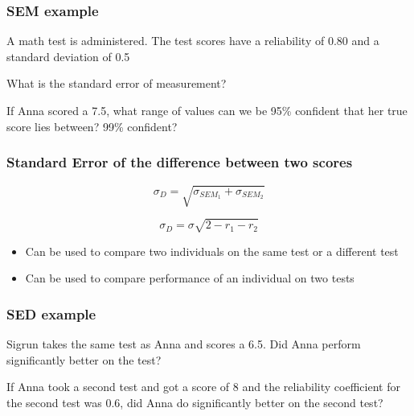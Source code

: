 \documentclass[dvipsnames]{beamer}\usepackage[]{graphicx}\usepackage[]{color}
\begin{document}
\begin{frame}
\frametitle{SEM example}

A math test is administered. The test scores have a reliability of 0.80 and a standard deviation of 0.5

\vspace{1cm}
What is the standard error of measurement?

\vspace{1cm}
If Anna scored a 7.5, what range of values can we be 95\% confident that her true score lies between? 99\% confident?
\end{frame}

\begin{frame}
\frametitle{Standard Error of the difference between two scores}
$$\sigma_D = \sqrt{\sigma_{SEM_1} + \sigma_{SEM_2}} $$

$$\sigma_D = \sigma\sqrt{2 - r_1 - r_2} $$

\begin{itemize}
  \item Can be used to compare two individuals on the same test or a different test
  \item Can be used to compare performance of an individual on two tests
\end{itemize}
\end{frame}

\begin{frame}
\frametitle{SED example}
Sigrun takes the same test as Anna and scores a 6.5. Did Anna perform significantly better on the test? 

\vspace{1cm}
If Anna took a second test and got a score of 8 and the reliability coefficient for the second test was 0.6, did Anna do significantly better on the second test?

\end{frame}
\end{document}
